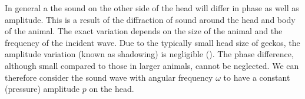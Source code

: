 In general a the sound on the other side of the head will differ in phase as well as amplitude. This is a result of the diffraction of 
sound around the head and body of the animal. The exact variation depends on the size of the animal and the frequency of the
incident wave. Due to the typically small head size of geckos, the amplitude variation 
(known as shadowing) is negligible (\cite{michelsenlarsen}). The phase difference, although small compared to those in larger animals, 
cannot be neglected. We can therefore consider the sound wave with angular frequency $\omega$ to have a constant (pressure) amplitude $p$
on the head.

